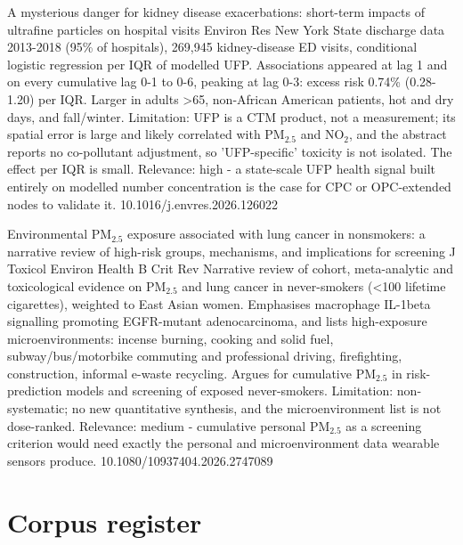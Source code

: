 \documentclass[10pt]{article}
\begin{document}
\par{}\baselineskip{}\baselineskip
{}

{A mysterious danger for kidney disease exacerbations: short-term impacts of ultrafine particles on hospital visits}
{Environ Res}
{New York State discharge data 2013-2018 (95\% of hospitals), 269,945 kidney-disease ED visits, conditional logistic regression per IQR of modelled UFP. Associations appeared at lag 1 and on every cumulative lag 0-1 to 0-6, peaking at lag 0-3: excess risk 0.74\% (0.28-1.20) per IQR. Larger in adults >65, non-African American patients, hot and dry days, and fall/winter. Limitation: UFP is a CTM product, not a measurement; its spatial error is large and likely correlated with PM$_{2.5}$ and NO$_2$, and the abstract reports no co-pollutant adjustment, so 'UFP-specific' toxicity is not isolated. The effect per IQR is small. Relevance: high - a state-scale UFP health signal built entirely on modelled number concentration is the case for CPC or OPC-extended nodes to validate it.}
{10.1016/j.envres.2026.126022}

{Environmental PM$_{2.5}$ exposure associated with lung cancer in nonsmokers: a narrative review of high-risk groups, mechanisms, and implications for screening}
{J Toxicol Environ Health B Crit Rev}
{Narrative review of cohort, meta-analytic and toxicological evidence on PM$_{2.5}$ and lung cancer in never-smokers (<100 lifetime cigarettes), weighted to East Asian women. Emphasises macrophage IL-1beta signalling promoting EGFR-mutant adenocarcinoma, and lists high-exposure microenvironments: incense burning, cooking and solid fuel, subway/bus/motorbike commuting and professional driving, firefighting, construction, informal e-waste recycling. Argues for cumulative PM$_{2.5}$ in risk-prediction models and screening of exposed never-smokers. Limitation: non-systematic; no new quantitative synthesis, and the microenvironment list is not dose-ranked. Relevance: medium - cumulative personal PM$_{2.5}$ as a screening criterion would need exactly the personal and microenvironment data wearable sensors produce.}
{10.1080/10937404.2026.2747089}

\clearpage
\section*{\sffamily\bfseries\color{Deep}Corpus register}
\vspace{-1.5mm}{\color{Amber}\rule{\linewidth}{1.1pt}}\vspace{2.5mm}
\end{document}
